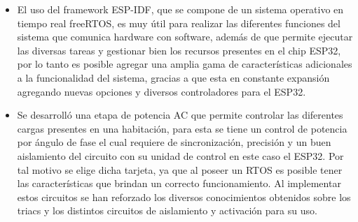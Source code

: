 \begin{frame}
\begin{itemize}
	\item El uso del framework ESP-IDF, que se compone de un sistema operativo en tiempo real freeRTOS, es muy útil para realizar las diferentes funciones del sistema que comunica hardware con software, además de que permite ejecutar las diversas tareas y gestionar bien los recursos presentes en el chip ESP32, por lo tanto es posible agregar una amplia gama de características adicionales a la funcionalidad del sistema, gracias a que esta en constante expansión agregando nuevas opciones y diversos controladores para el ESP32.\\
\end{itemize}
\end{frame}


\begin{frame}
\begin{itemize}
	\item Se desarrolló una etapa de potencia AC que permite controlar las diferentes cargas presentes en una habitación, para esta se tiene un control de potencia por ángulo de fase el cual requiere de sincronización, precisión y un buen aislamiento del circuito con su unidad de control en este caso el ESP32. Por tal motivo se elige dicha tarjeta, ya que al poseer un RTOS es posible tener las características que brindan un correcto funcionamiento. Al implementar estos circuitos se han reforzado los diversos conocimientos obtenidos sobre los triacs y los distintos circuitos de aislamiento y activación para su uso.\\
	
\end{itemize}
\end{frame}